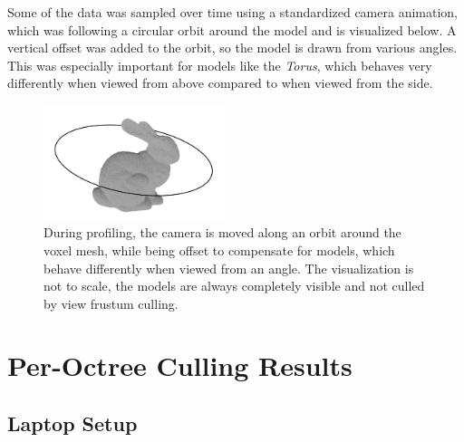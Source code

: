 \noindent
Some of the data was sampled over time using a standardized camera animation, which was following a circular orbit 
around the model and is visualized below. A vertical offset was added to the orbit, so the model is drawn from various 
angles. This was especially important for models like the \emph{Torus}, which behaves very differently when viewed 
from above compared to when viewed from the side.

\begin{figure}[h]
    \centering
    \includegraphics[width=200px]{images/graphics/test-anim-camera-path.jpg}
    \caption{During profiling, the camera is moved along an orbit around the voxel mesh, while being offset to compensate 
    for models, which behave differently when viewed from an angle. The visualization is not to scale, the models 
    are always completely visible and not culled by view frustum culling.}
    \label{fig:test-anim-camera-path}
\end{figure}



%
%
%
%
%
%


\section{Per-Octree Culling Results}


\subsection*{Laptop Setup}


